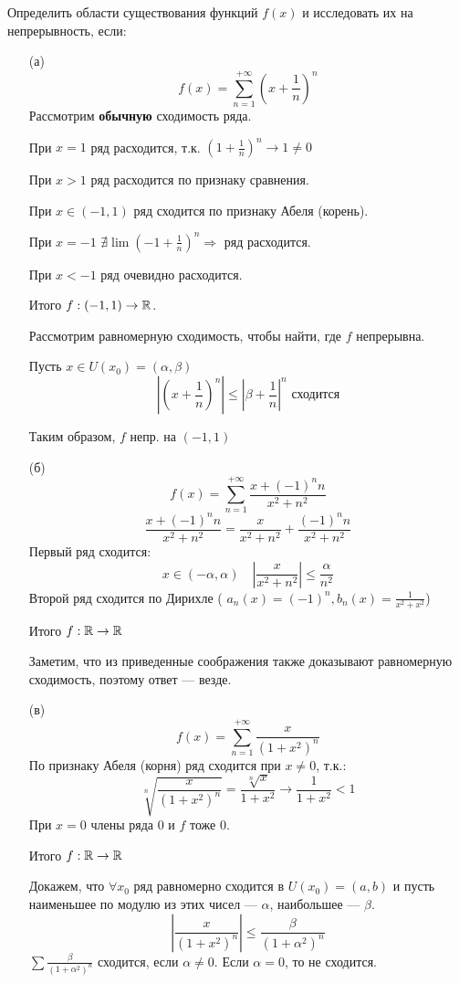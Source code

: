 \begin{exercise}[2795]
    Определить области существования функций \(f(x)\) и исследовать их на непрерывность, если:
    \begin{enumerate}
        \item [(а)] \[f(x) = \sum_{n = 1}^{+\infty} \left( x + \frac{1}{n} \right)^n\]
              Рассмотрим \textbf{обычную} сходимость ряда.

              При \(x = 1\) ряд расходится, т.к. \((1 + \frac{1}{n})^n \to 1 \neq 0\)

              При \(x > 1\) ряд расходится по признаку сравнения.

              При \(x \in (- 1, 1)\) ряд сходится по признаку Абеля (корень).

              При \(x = - 1\) \(\nexists \lim ( - 1 + \frac{1}{n})^n \Rightarrow \) ряд расходится.

              При \(x < - 1\) ряд очевидно расходится.

              Итого \(f : ( - 1, 1) \to \mathbb{R}\).

              Рассмотрим равномерную сходимость, чтобы найти, где \(f\) непрерывна.

              Пусть \(x\in U(x_0) = (\alpha, \beta)\)
              \[\left|\left( x + \frac{1}{n} \right)^n\right| \leq \left| \beta + \frac{1}{n}\right|^n \text{ сходится}\]

              Таким образом, \(f\) непр. на \(( - 1, 1)\)
        \item [(б)] \[f(x) = \sum_{n = 1}^{+\infty} \frac{x + ( - 1)^n n}{x^2 + n^2} \]
              \[\frac{x + ( - 1)^n n}{x^2 + n^2} = \frac{x}{x^2 + n^2} + \frac{( - 1)^n n}{x^2 + n^2} \]
              Первый ряд сходится:
              \[x\in ( - \alpha, \alpha) \quad \left|\frac{x}{x^2 + n^2}\right| \leq \frac{\alpha}{n^2}\]
              Второй ряд сходится по Дирихле ( \(a_n(x) = ( - 1)^n, b_n(x) = \frac{1}{x^2 + x^2}\))

              Итого \(f : \mathbb{R} \to \mathbb{R}\)

              Заметим, что из приведенные соображения также доказывают равномерную сходимость, поэтому ответ --- везде.
        \item [(в)] \[f(x) = \sum_{n = 1}^{+\infty} \frac{x}{(1 + x^2)^n} \]
              По признаку Абеля (корня) ряд сходится при \(x \neq 0\), т.к.:
              \[\sqrt[n]{\frac{x}{(1 + x^2)^n}} = \frac{\sqrt[n]{x}}{1 + x^2} \to \frac{1}{1 + x^2} < 1\]
              При \(x = 0\) члены ряда 0 и \(f\) тоже \(0\).

              Итого \(f : \mathbb{R}\to \mathbb{R}\)

              Докажем, что \(\forall x_0\) ряд равномерно сходится в \(U(x_0) = (a, b)\) и пусть наименьшее по модулю из этих чисел --- \(\alpha\), наибольшее --- \(\beta\).
              \[\left|\frac{x}{(1 + x^2)^n}\right| \leq \frac{\beta}{(1 + \alpha^2)^n}\]
              \(\sum \frac{\beta}{(1 + \alpha^2)^n}\) сходится, если \(\alpha \neq 0\). Если \(\alpha = 0\), то не сходится.
    \end{enumerate}
\end{exercise}

